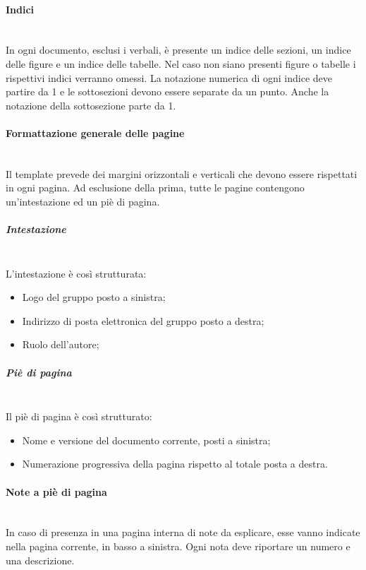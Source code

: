 		\paragraph{Indici} \mbox{} \\
		In ogni documento, esclusi i verbali, è presente un indice delle sezioni, un indice delle figure e un indice delle tabelle. Nel caso non siano presenti figure o tabelle i rispettivi indici verranno omessi. La notazione numerica di ogni indice deve partire da 1 e le sottosezioni devono essere separate da un punto. Anche la notazione della sottosezione parte da 1.
		
		\paragraph{Formattazione generale delle pagine} \mbox{} \\
		Il template prevede dei margini orizzontali e verticali che devono essere rispettati in ogni pagina. Ad esclusione della prima, tutte le pagine contengono un’intestazione ed un piè di pagina. 
			
			\subparagraph{Intestazione} \mbox{} \\
			L’intestazione è così strutturata:
			\begin{itemize}
				\item Logo del gruppo posto a sinistra;
				\item Indirizzo di posta elettronica del gruppo posto a destra;
				\item Ruolo dell’autore;
			\end{itemize}
			
			\subparagraph{Piè di pagina} \mbox{} \\
			Il piè di pagina è così strutturato:
			\begin{itemize}
				\item Nome e versione del documento corrente, posti a sinistra;
				\item Numerazione progressiva della pagina rispetto al totale posta a destra.
			\end{itemize}
		
		\paragraph{Note a piè di pagina} \mbox{} \\
		In caso di presenza in una pagina interna di note da esplicare, esse vanno indicate nella pagina corrente, in basso a sinistra. Ogni nota deve riportare un numero e una	descrizione.
		
